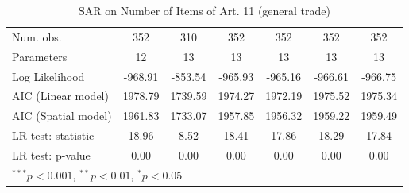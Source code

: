 \begin{table}[!h]
\begin{center}
\begin{tabular}{l c c c c c c }
\midrule
Num. obs.               & 352          & 310         & 352          & 352          & 352          & 352          \\
Parameters              & 12           & 13          & 13           & 13           & 13           & 13           \\
Log Likelihood          & -968.91      & -853.54     & -965.93      & -965.16      & -966.61      & -966.75      \\
AIC (Linear model)      & 1978.79      & 1739.59     & 1974.27      & 1972.19      & 1975.52      & 1975.34      \\
AIC (Spatial model)     & 1961.83      & 1733.07     & 1957.85      & 1956.32      & 1959.22      & 1959.49      \\
LR test: statistic      & 18.96        & 8.52        & 18.41        & 17.86        & 18.29        & 17.84        \\
LR test: p-value        & 0.00         & 0.00        & 0.00         & 0.00         & 0.00         & 0.00         \\
\bottomrule
\multicolumn{7}{l}{\scriptsize{$^{***}p<0.001$, $^{**}p<0.01$, $^*p<0.05$}}
\end{tabular}
\caption{SAR on Number of Items of Art. 11 (general trade)}
\label{table:coefficients}
\end{center}
\end{table}
